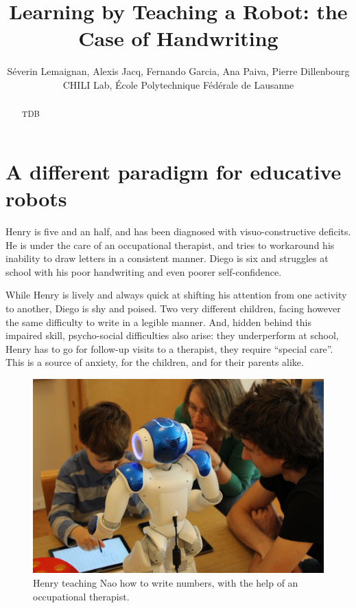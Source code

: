 \documentclass{article}
\title{Learning by Teaching a Robot: the Case of Handwriting}
\author{S\'everin Lemaignan, Alexis Jacq, Fernando Garcia, Ana Paiva, Pierre
Dillenbourg \\ CHILI Lab, \'Ecole Polytechnique F\'ed\'erale de Lausanne}
\begin{document}
\maketitle

\begin{abstract}
    TDB
\end{abstract}


\section{A different paradigm for educative robots}

Henry is five and an half, and has been diagnosed with visuo-constructive
deficits. He is under the care of an occupational therapist, and tries to
workaround his inability to draw letters in a consistent manner. Diego is six
and struggles at school with his poor handwriting and even poorer
self-confidence.

While Henry is lively and always quick at shifting his attention from one
activity to another, Diego is shy and poised. Two very different children,
facing however the same difficulty to write in a legible manner. And, hidden
behind this impaired skill, psycho-social difficulties also arise: they
underperform at school, Henry has to go for follow-up visits to a therapist,
they require ``special care''. This is a source of anxiety, for the children,
and for their parents alike.

\begin{figure}
    \centering
    \includegraphics[width=0.9\linewidth]{henry}
    \caption{Henry teaching Nao how to write numbers, with the help of an
    occupational therapist.}
    \label{fig:henry}
\end{figure}
\end{document}
